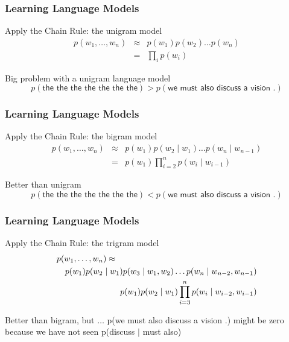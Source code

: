 \begin{frame}
\frametitle{Learning Language Models}
\begin{block}{Apply the Chain Rule: the unigram model}
\begin{eqnarray*}
p(w_1, \ldots, w_n) &\approx& p(w_1) p(w_2) \ldots p(w_n) \\
&=& \prod_i p(w_i)
\end{eqnarray*}
\end{block}
\pause
\begin{block}{Big problem with a unigram language model}
\[ p(\textsf{the the the the the the the}) > p(\textsf{we must also discuss a vision .}) \]
\end{block}

\end{frame}


\begin{frame}
\frametitle{Learning Language Models}
\begin{block}{Apply the Chain Rule: the bigram model}
\begin{eqnarray*}
p(w_1, \ldots, w_n) &\approx& p(w_1) p(w_2 \mid w_1) \ldots p(w_n \mid w_{n-1}) \\
&=& p(w_1) \prod_{i=2}^n p(w_i \mid w_{i-1})
\end{eqnarray*}
\end{block}
\pause
\begin{block}{Better than unigram}
\[ p(\textsf{the the the the the the the}) < p(\textsf{we must also discuss a vision .}) \]
\end{block}
\end{frame}

\begin{frame}
\frametitle{Learning Language Models}
\begin{block}{Apply the Chain Rule: the trigram model}
\begin{eqnarray*}
\lefteqn{p(w_1, \ldots, w_n) \approx} \\
&& p(w_1) p(w_2 \mid w_1) p(w_3 \mid w_1, w_2) \ldots p(w_n \mid w_{n-2}, w_{n-1}) \\
&& p(w_1) p(w_2 \mid w_1) \prod_{i=3}^n p(w_i \mid w_{i-2}, w_{i-1})
\end{eqnarray*}
\end{block}
\pause
\begin{block}{Better than bigram, but $\ldots$}
p(\textsf{we must also discuss a vision .}) might be zero because we have not seen p(discuss $\mid$ must also)
\end{block}
\end{frame}

